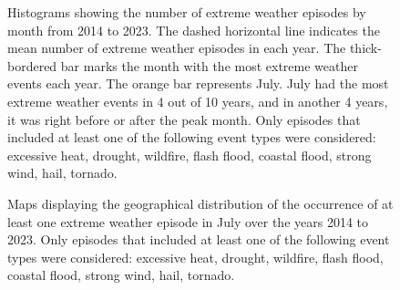 \documentclass[
  letterpaper,
  DIV=11,
  numbers=noendperiod]{scrartcl}
\begin{document}
\begin{figure}[h]


\caption{\label{fig-p.hist}Histograms showing the number of extreme
weather episodes by month from 2014 to 2023. The dashed horizontal line
indicates the mean number of extreme weather episodes in each year. The
thick-bordered bar marks the month with the most extreme weather events
each year. The orange bar represents July. July had the most extreme
weather events in 4 out of 10 years, and in another 4 years, it was
right before or after the peak month. Only episodes that included at
least one of the following event types were considered: excessive heat,
drought, wildfire, flash flood, coastal flood, strong wind, hail,
tornado.}

\end{figure}%

\begin{figure}[h]


\caption{\label{fig-p.map_bin}Maps displaying the geographical
distribution of the occurrence of at least one extreme weather episode
in July over the years 2014 to 2023. Only episodes that included at
least one of the following event types were considered: excessive heat,
drought, wildfire, flash flood, coastal flood, strong wind, hail,
tornado.}

\end{figure}%
\end{document}
